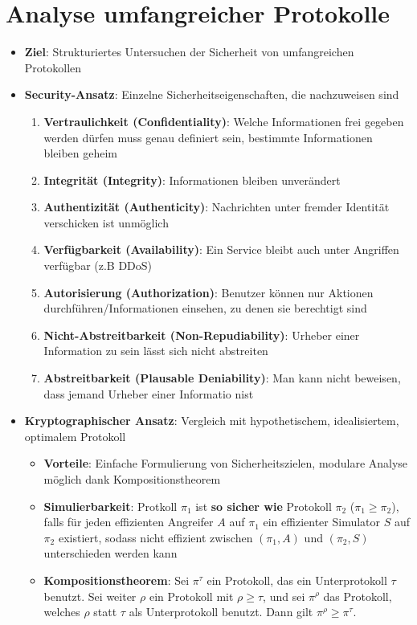\section{Analyse umfangreicher Protokolle}%
\label{aup:sec:analyse_umfangreicher_protokolle}

\begin{itemize}
	\item \textbf{Ziel}: Strukturiertes Untersuchen der Sicherheit von umfangreichen Protokollen
	\item \textbf{Security-Ansatz}: Einzelne Sicherheitseigenschaften, die nachzuweisen sind
	\begin{enumerate}
		\item \textbf{Vertraulichkeit (Confidentiality)}: Welche Informationen frei gegeben werden dürfen muss genau definiert sein, bestimmte Informationen bleiben geheim
		\item \textbf{Integrität (Integrity)}: Informationen bleiben unverändert
		\item \textbf{Authentizität (Authenticity)}: Nachrichten unter fremder Identität verschicken ist unmöglich
		\item \textbf{Verfügbarkeit (Availability)}: Ein Service bleibt auch unter Angriffen verfügbar (z.B DDoS)
		\item \textbf{Autorisierung (Authorization)}: Benutzer können nur Aktionen durchführen/Informationen einsehen, zu denen sie berechtigt sind
		\item \textbf{Nicht-Abstreitbarkeit (Non-Repudiability)}: Urheber einer Information zu sein lässt sich nicht abstreiten
		\item \textbf{Abstreitbarkeit (Plausable Deniability)}: Man kann nicht beweisen, dass jemand Urheber einer Informatio nist
	\end{enumerate}
	\item \textbf{Kryptographischer Ansatz}: Vergleich mit hypothetischem, idealisiertem, optimalem Protokoll
	\begin{itemize}
		\item \textbf{Vorteile}: Einfache Formulierung von Sicherheitszielen, modulare Analyse möglich dank Kompositionstheorem
		\item \textbf{Simulierbarkeit}: Protkoll $\pi_1$ ist \textbf{so sicher wie} Protokoll $\pi_2$ ($\pi_1 \geq \pi_2$), falls für jeden effizienten Angreifer $A$ auf $\pi_1$ ein effizienter Simulator $S$ auf $\pi_2$ existiert, sodass nicht effizient zwischen $(\pi_1, A)$ und $(\pi_2, S)$ unterschieden werden kann
		\item \textbf{Kompositionstheorem}: Sei $\pi^\tau$ ein Protokoll, das ein Unterprotokoll $\tau$ benutzt. Sei weiter $\rho$ ein Protokoll mit $\rho \geq \tau$, und sei $\pi^\rho$ das Protokoll, welches $\rho$ statt $\tau$ als Unterprotokoll benutzt. Dann gilt $\pi^\rho \geq \pi^\tau$.
	\end{itemize}
\end{itemize}